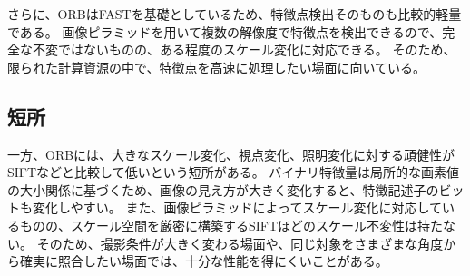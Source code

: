 \documentclass[11pt,a4paper]{ltjsarticle}
\begin{document}
さらに、ORBはFASTを基礎としているため、特徴点検出そのものも比較的軽量である。
画像ピラミッドを用いて複数の解像度で特徴点を検出できるので、完全な不変ではないものの、ある程度のスケール変化に対応できる。
そのため、限られた計算資源の中で、特徴点を高速に処理したい場面に向いている。

\subsection*{短所}

一方、ORBには、大きなスケール変化、視点変化、照明変化に対する頑健性がSIFTなどと比較して低いという短所がある。
バイナリ特徴量は局所的な画素値の大小関係に基づくため、画像の見え方が大きく変化すると、特徴記述子のビットも変化しやすい。
また、画像ピラミッドによってスケール変化に対応しているものの、スケール空間を厳密に構築するSIFTほどのスケール不変性は持たない。
そのため、撮影条件が大きく変わる場面や、同じ対象をさまざまな角度から確実に照合したい場面では、十分な性能を得にくいことがある。
\end{document}
